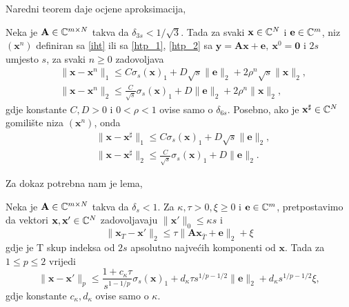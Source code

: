 \documentclass[a4paper,twoside,12pt]{memoir} %
\newcommand{\vect}[1]{\mathbf{#1}}
\renewcommand{\vec}{\vect}
\newcommand{\norm}[1]{\|{#1}\|}
\begin{document}
\noindent
Naredni teorem daje ocjene aproksimacija,
\begin{thm}\label{tm:6:21}
    Neka je $\vec A \in \C^{m \times N}$ takva da $\delta_{3s} < 1/\sqrt{3}$. Tada za svaki $\vec x \in \C^N$ i $\vec e \in \C^m$, niz $(\vec x^n)$ definiran sa \eqref{iht} ili sa \eqref{htp_1}, \eqref{htp_2} sa $\vec y = \vec{Ax} + \vec e,\ \vec x^0 = \vec 0$ i $2s$ umjesto $s$, za svaki $n \geq 0$ zadovoljava
    \begin{align*}
        & \norm{\vec x - \vec x^n}_1 \leq C \sigma_s(\vec x)_1 + D \sqrt{s} \norm{\vec e}_2 + 2 \rho^n \sqrt{s} \norm{\vec x}_2,\\[0.5em]
        & \norm{\vec x - \vec x^n}_2 \leq \frac{C}{\sqrt{s}}  \sigma_s(\vec x)_1 + D \norm{\vec e}_2 + 2 \rho^n \norm{\vec x}_2,
    \end{align*}
    gdje konstante $C, D > 0$ i $0<\rho < 1$ ovise samo o $\delta_{6s}$. Posebno, ako je $\vec x^{\sharp} \in \C^N$ gomili\v{s}te niza $(\vec x^n)$, onda
    \begin{align*}
        & \norm{\vec x - \vec x^{\sharp}}_1 \leq C \sigma_s(\vec x)_1 + D \sqrt{s} \norm{\vec e}_2, \\[0.5em]
        & \norm{\vec x - \vec x^{\sharp}}_2 \leq \frac{C}{\sqrt{s}}  \sigma_s(\vec x)_1 + D \norm{\vec e}_2 .
    \end{align*}
\end{thm}

\noindent
Za dokaz potrebna nam je lema,
\begin{lem}\label{lem:6:23}
    Neka je $\vec A \in \C^{m \times N}$ takva da $\delta_s < 1$. Za $\kappa, \tau > 0, \xi \geq 0$ i $\vec e \in \C^m$, pretpostavimo da vektori $\vec x, \vec x' \in \C^N$ zadovoljavaju $\norm{\vec x'}_0 \leq \kappa s$ i 
    \begin{equation*}
        \norm{\vec x_T - \vec x'}_2 \leq \tau \norm{\vec{Ax}_{\bar T} + \vec e}_2 + \xi 
    \end{equation*}
    gdje je T skup indeksa od $2s$ apsolutno najve\'cih komponenti od $\vec x$. Tada za $1 \leq p \leq 2$ vrijedi
    \begin{equation}\label{6:35}
        \norm{\vec x - \vec x'}_p \leq \frac{1+c_{\kappa} \tau}{s^{1-1/p}}\sigma_s(\vec x)_1 + d_{\kappa} \tau s^{1/p - 1/2} \norm{\vec e}_2 + d_{\kappa} s^{1/p - 1/2} \xi, 
    \end{equation}
    gdje konstante $c_{\kappa}, d_{\kappa}$ ovise samo o $\kappa$.
\end{lem}
\end{document}
